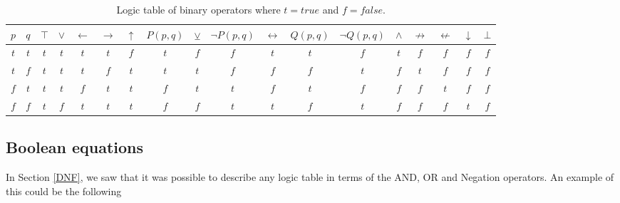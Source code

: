                 \begin{table}[h!]
                    \centering
                    \begin{tabular}{|c|c||c|c|c|c|c|c|c|c|c|c|c|c|c|c|c|c|}
                    	\hline
                    	$p$ & $q$ & $\top$ & $\vee$ & $\leftarrow$ & $\rightarrow$ & $\uparrow$ & $P(p,q)$ & $\veebar$ & $\neg P(p,q)$ & $\leftrightarrow$ & $Q(p, q)$ & $\neg Q(p,q)$ & $\wedge$ & $\not\rightarrow$ & $\not\leftarrow$ & $\downarrow$ & $\bot$ \\ \hline
                    	$t$ & $t$ &  $t$   &  $t$   &     $t$      &      $t$      &    $f$     &   $t$    &    $f$    &      $f$      &        $t$        &    $t$    &      $f$      &   $t$    &        $f$        &       $f$        &     $f$      &  $f$   \\ \hline
                    	$t$ & $f$ &  $t$   &  $t$   &     $t$      &      $f$      &    $t$     &   $t$    &    $t$    &      $f$      &        $f$        &    $f$    &      $t$      &   $f$    &        $t$        &       $f$        &     $f$      &  $f$   \\ \hline
                    	$f$ & $t$ &  $t$   &  $t$   &     $f$      &      $t$      &    $t$     &   $f$    &    $t$    &      $t$      &        $f$        &    $t$    &      $f$      &   $f$    &        $f$        &       $t$        &     $f$      &  $f$   \\ \hline
                    	$f$ & $f$ &  $t$   &  $f$   &     $t$      &      $t$      &    $t$     &   $f$    &    $f$    &      $t$      &        $t$        &    $f$    &      $t$      &   $f$    &        $f$        &       $f$        &     $t$      &  $f$   \\ \hline
                    \end{tabular} 
                    \caption{Logic table of binary operators where $t=true$ and $f=false$.} 
                    \label{LogicTable:BinaryOperators}
                \end{table}
        
        \subsection{Boolean equations}\label{Section:BooleanEquation}
        
            In Section \ref{DNF}, we saw that it was possible to describe any logic table in terms of the AND, OR and Negation operators. An example of this could be the following
            
